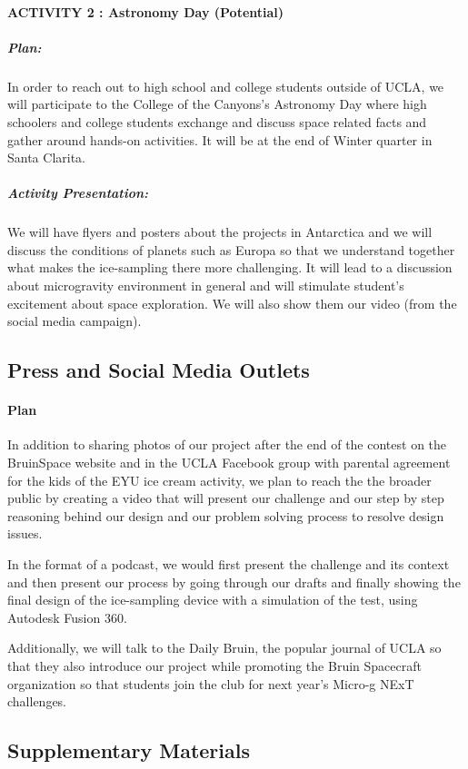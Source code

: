 \documentclass{article}
\begin{document}
\paragraph{ACTIVITY 2 : Astronomy Day (Potential)}
\subparagraph{Plan:}
In order to reach out to high school and college students outside of UCLA, we will participate to the College of the Canyons’s Astronomy Day where high schoolers and college students exchange and discuss space related facts and gather around hands-on activities. It will be at the end of Winter quarter in Santa Clarita.
\subparagraph{Activity Presentation:}
We will have flyers and posters about the projects in Antarctica and we will discuss the conditions of planets such as Europa so that we understand together what makes the ice-sampling there more challenging. It will lead to a discussion about microgravity environment in general and will stimulate student’s excitement about space exploration. We will also show them our video (from the social media campaign).

\subsection{Press and Social Media Outlets}
\paragraph{Plan}
In addition to sharing photos of our project after the end of the contest on the BruinSpace website and in the UCLA Facebook group with parental agreement for the kids of the EYU ice cream activity, we plan to reach the the broader public by creating a video that will present our challenge and our step by step reasoning behind our design and our problem solving process to resolve design issues.\par
In the format of a podcast, we would first present the challenge and its context and then present our process by going through our drafts and finally showing the final design of the ice-sampling device with a simulation of the test, using Autodesk Fusion 360.\par
Additionally, we will talk to the Daily Bruin, the popular journal of UCLA so that they also introduce our project while promoting the Bruin Spacecraft organization so that students join the club for next year’s Micro-g NExT challenges.
\subsection{Supplementary Materials}
\end{document}
